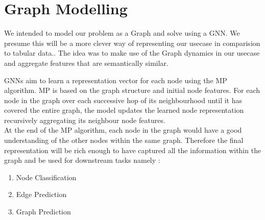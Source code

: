 \documentclass{report} %
\begin{document}
\chapter{Graph Modelling} 

We intended to model our problem as a Graph and solve using a \ac{GNN}. 
We presume this will be a more clever way of representing our usecase in comparision to tabular data..
The idea was to make use of the Graph dynamics in our usecase and aggregate features that are semantically similar.

\ac{GNN}s aim to learn a representation vector for each node using the \ac{MP} algorithm.
\ac{MP} is based on the graph structure and initial node features.
For each node in the graph over each successive hop of its neighbourhood until it has covered the entire graph, the model updates the learned node representation recursively aggregating its neighbour node features.\\
At the end of the \ac{MP} algorithm, each node in the graph would have a good understanding of the other nodes within the same graph.
Therefore the final representation will be rich enough to have captured all the information within the graph and be used for downstream tasks namely :

\begin{enumerate}
    \item Node Classification
    \item Edge Prediction
    \item Graph Prediction
\end{enumerate}
\end{document}
